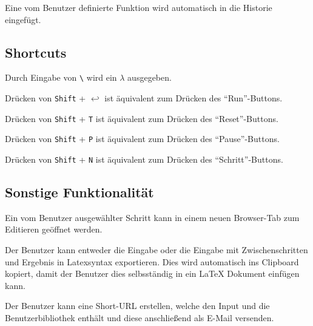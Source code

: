 \documentclass[parskip=full,11pt,twoside]{scrartcl}
\begin{document}
Eine vom Benutzer definierte Funktion wird automatisch in die Historie eingefügt.

\subsection{Shortcuts}

Durch Eingabe von \texttt{\textbackslash} wird ein \texttt{$\lambda$} ausgegeben.

Drücken von \texttt{Shift} + \texttt{$\hookleftarrow$} ist äquivalent zum Drücken des \enquote{Run}-Buttons.

Drücken von \texttt{Shift} + \texttt{T} ist äquivalent zum Drücken des \enquote{Reset}-Buttons.

Drücken von \texttt{Shift} + \texttt{P} ist äquivalent zum Drücken des \enquote{Pause}-Buttons.

Drücken von \texttt{Shift} + \texttt{N} ist äquivalent zum Drücken des \enquote{Schritt}-Buttons.



\subsection{Sonstige Funktionalität}

Ein vom Benutzer ausgewählter Schritt kann in einem neuen Browser-Tab zum Editieren geöffnet werden.

Der Benutzer kann entweder die Eingabe oder die Eingabe mit Zwischenschritten und Ergebnis in Latexsyntax exportieren. Dies wird automatisch ins Clipboard kopiert, damit der Benutzer dies selbsständig in ein LaTeX Dokument einfügen kann.

Der Benutzer kann eine Short-URL erstellen, welche den Input und die Benutzerbibliothek enthält und diese anschließend als E-Mail versenden.
\end{document}
